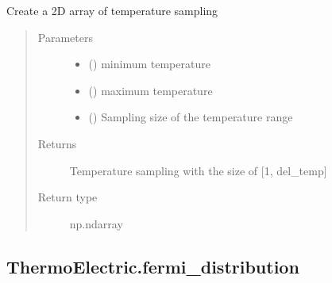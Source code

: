 \documentclass[letterpaper,10pt,english]{sphinxmanual}
\begin{document}
\begin{fulllineitems}
\label{\detokenize{autosummary/ThermoElectric.temperature:ThermoElectric.temperature}}
\sphinxAtStartPar
Create a 2D array of temperature sampling
\begin{quote}\begin{description}
\item[{Parameters}] \leavevmode\begin{itemize}
\item {} 
\sphinxAtStartPar
{} () \textendash{} minimum temperature

\item {} 
\sphinxAtStartPar
{} () \textendash{} maximum temperature

\item {} 
\sphinxAtStartPar
{} () \textendash{} Sampling size of the temperature range

\end{itemize}

\item[{Returns}] \leavevmode
\sphinxAtStartPar
{} \textendash{} Temperature sampling with the size of {[}1, del\_temp{]}

\item[{Return type}] \leavevmode
\sphinxAtStartPar
np.ndarray

\end{description}\end{quote}

\end{fulllineitems}



\subsection{ThermoElectric.fermi\_distribution}
\label{\detokenize{autosummary/ThermoElectric.fermi_distribution:thermoelectric-fermi-distribution}}\label{\detokenize{autosummary/ThermoElectric.fermi_distribution::doc}}
\end{document}
